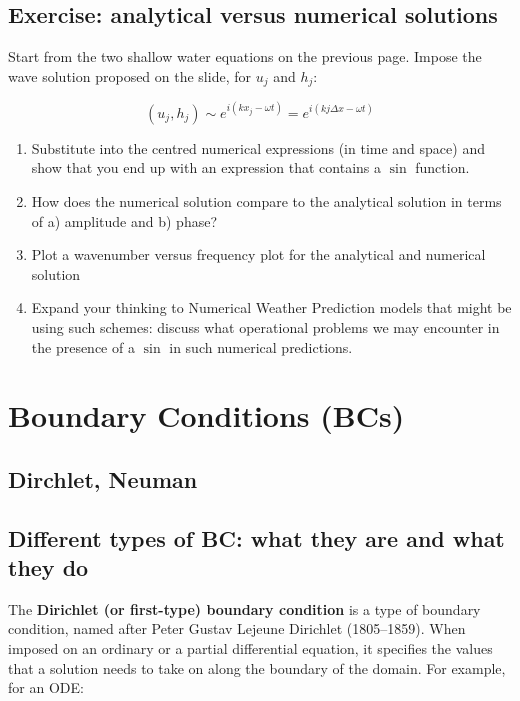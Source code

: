\subsection{Exercise: analytical versus numerical solutions} 

Start from the two shallow water equations on the previous page. Impose the wave solution proposed on the slide, for $u_j$ and $h_j$: 

\begin{equation}
	(u_j,h_j) \sim e^{i(k x_j -\omega t)} = e^{i(k j \Delta x -\omega t)}
\end{equation}

\begin{enumerate}
	\item Substitute into the centred numerical expressions (in time and space) and show that you end up with an expression that contains a $\sin$ function.
	\item How does the numerical solution compare to the analytical solution in terms of a) amplitude and b) phase?
	\item Plot a wavenumber versus frequency plot for the analytical and numerical solution
	\item Expand your thinking to Numerical Weather Prediction models that might be using such schemes: discuss what operational problems we may encounter in the presence of a $\sin$ in such numerical predictions.
\end{enumerate}


\newpage

\section{Boundary Conditions (BCs)}

\subsection{Dirchlet, Neuman}
\subsection{Different types of BC: what they are and what they do}

The \textbf{Dirichlet (or first-type) boundary condition }is a type of boundary condition, named after Peter Gustav Lejeune Dirichlet (1805–1859). When imposed on an ordinary or a partial differential equation, it specifies the values that a solution needs to take on along the boundary of the domain. For example, for an ODE:

